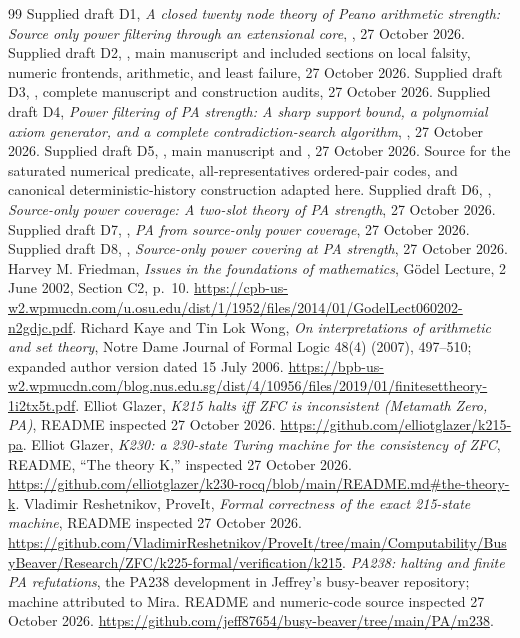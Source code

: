 \begin{thebibliography}{99}
Supplied draft D1, \emph{A closed twenty node theory of Peano arithmetic strength: Source only power filtering through an extensional core},
, 27 October 2026.
Supplied draft D2, , main manuscript and included sections on local falsity, numeric frontends, arithmetic, and least failure, 27 October 2026.
Supplied draft D3, , complete manuscript and construction audits, 27 October 2026.
Supplied draft D4, \emph{Power filtering of PA strength: A sharp support bound, a polynomial axiom generator, and a complete contradiction-search algorithm},
, 27 October 2026.
Supplied draft D5, , main manuscript and
, 27 October 2026. Source for the saturated numerical predicate, all-representatives ordered-pair codes, and canonical deterministic-history construction adapted here.
Supplied draft D6, ,
\emph{Source-only power coverage: A two-slot theory of PA strength}, 27 October 2026.
Supplied draft D7, ,
\emph{PA from source-only power coverage}, 27 October 2026.
Supplied draft D8, ,
\emph{Source-only power covering at PA strength}, 27 October 2026.
Harvey M. Friedman, \emph{Issues in the foundations of mathematics},
G\"odel Lecture, 2 June 2002, Section C2, p.~10.
\url{https://cpb-us-w2.wpmucdn.com/u.osu.edu/dist/1/1952/files/2014/01/GodelLect060202-n2gdjc.pdf}.
Richard Kaye and Tin Lok Wong, \emph{On interpretations of arithmetic and set theory},
Notre Dame Journal of Formal Logic 48(4) (2007), 497--510;
expanded author version dated 15 July 2006.
\url{https://bpb-us-w2.wpmucdn.com/blog.nus.edu.sg/dist/4/10956/files/2019/01/finitesettheory-1i2tx5t.pdf}.
Elliot Glazer, \emph{K215 halts iff ZFC is inconsistent (Metamath Zero, PA)}, README inspected 27 October 2026.
\url{https://github.com/elliotglazer/k215-pa}.
Elliot Glazer, \emph{K230: a 230-state Turing machine for the consistency of ZFC}, README, ``The theory K,'' inspected 27 October 2026.
\url{https://github.com/elliotglazer/k230-rocq/blob/main/README.md#the-theory-k}.
Vladimir Reshetnikov, ProveIt, \emph{Formal correctness of the exact 215-state machine}, README inspected 27 October 2026.
\url{https://github.com/VladimirReshetnikov/ProveIt/tree/main/Computability/BusyBeaver/Research/ZFC/k225-formal/verification/k215}.
\emph{PA238: halting and finite PA refutations}, the PA238 development in Jeffrey's busy-beaver repository; machine attributed to Mira. README and numeric-code source inspected 27 October 2026.
\url{https://github.com/jeff87654/busy-beaver/tree/main/PA/m238}.
\end{thebibliography}
